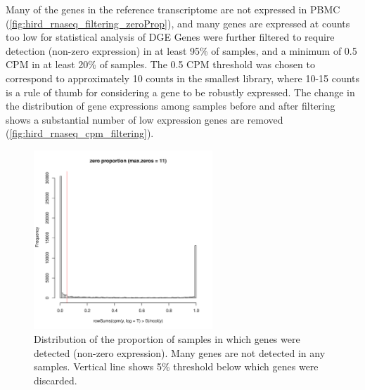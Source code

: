 Many of the genes in the reference transcriptome are not expressed in \gls{PBMC} (\autoref{fig:hird_rnaseq_filtering_zeroProp}), and many genes are expressed at counts too low for statistical analysis of \gls{DGE}
Genes were further filtered to require detection (non-zero expression) in at least 95\% of samples, and a minimum of 0.5 \gls{CPM} in at least 20\% of samples.
The 0.5 \gls{CPM} threshold was chosen to correspond to approximately 10 counts in the smallest library, where 10-15 counts is a rule of thumb for considering a gene to be robustly expressed\autocite{chen2016ReadsGenesPathways}.
The change in the distribution of gene expressions among samples before and after filtering shows a substantial number of low expression genes are removed (\autoref{fig:hird_rnaseq_cpm_filtering}).

\begin{figure}
    \centering
    \includegraphics[width=0.6\textwidth, page=1]{mainmatter/figures/chapter_02/rnaseq_data_setup.gene_zero_prop.pdf}
    \caption{Distribution of the proportion of samples in which genes were detected (non-zero expression). Many genes are not detected in any samples. Vertical line shows 5\% threshold below which genes were discarded.}
    \label{fig:hird_rnaseq_filtering_zeroProp}
\end{figure}

